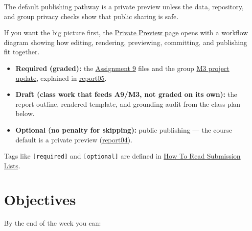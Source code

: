 \documentclass[
  letterpaper,
  DIV=11,
  numbers=noendperiod,
  oneside]{scrreprt}
\providecommand{\tightlist}{%
  \setlength{\itemsep}{0pt}\setlength{\parskip}{0pt}}
\begin{document}
The default publishing pathway is a private preview unless the data,
repository, and group privacy checks show that public sharing is safe.

If you want the big picture first, the
\href{report04-private-preview.qmd}{Private Preview page} opens with a
workflow diagram showing how editing, rendering, previewing, committing,
and publishing fit together.

\begin{tcolorbox}[enhanced jigsaw, title=\textcolor{quarto-callout-important-color}{\faExclamation}\hspace{0.5em}{Required / Draft / Optional This Week}, arc=.35mm, toptitle=1mm, colframe=quarto-callout-important-color-frame, toprule=.15mm, leftrule=.75mm, bottomtitle=1mm, opacityback=0, bottomrule=.15mm, coltitle=black, breakable, opacitybacktitle=0.6, titlerule=0mm, colback=white, left=2mm, colbacktitle=quarto-callout-important-color!10!white, rightrule=.15mm]

\begin{itemize}
\tightlist
\item
  \textbf{Required (graded):} the
  \href{../../assignments/assignment09-reporting/README.md}{Assignment
  9} files and the group
  \href{../../milestones/m3-project-update/README.md}{M3 project
  update}, explained in
  \href{report05-assignment-a9-and-m3.qmd}{report05}.
\item
  \textbf{Draft (class work that feeds A9/M3, not graded on its own):}
  the report outline, rendered template, and grounding audit from the
  class plan below.
\item
  \textbf{Optional (no penalty for skipping):} public publishing --- the
  course default is a private preview
  (\href{report04-private-preview.qmd}{report04}).
\end{itemize}

Tags like \texttt{{[}required{]}} and \texttt{{[}optional{]}} are
defined in \hyperref[how-to-read-submission-lists]{How To Read
Submission Lists}.

\end{tcolorbox}

\section*{Objectives}\label{objectives-4}


By the end of the week you can:
\end{document}
